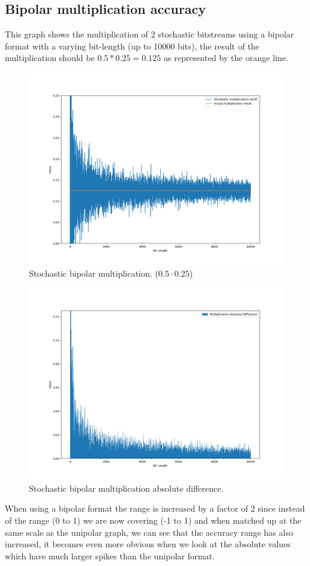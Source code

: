 \documentclass[a4paper,oneside,phd,etd]{BYUPhys}
\begin{document}
\subsection{Bipolar multiplication accuracy}
This graph shows the multiplication of 2 stochastic bitstreams using a bipolar format with a varying bit-length (up to 10000 bits), the result of the multiplication should be $0.5*0.25=0.125$ as represented by the orange line.
\begin{figure}[H]
\centering
\includegraphics[scale=0.4]{results/mult-bi.png}
\caption{Stochastic bipolar multiplication. ($0.5\cdot 0.25$)}
\label{fig:mult}
\end{figure}
\begin{figure}[H]
\centering
\includegraphics[scale=0.4]{results/mult-bi-abs.png}
\caption{Stochastic bipolar multiplication absolute difference.}
\label{fig:abs_mult}
\end{figure}
When using a bipolar format the range is increased by a factor of 2 since instead of the range (0 to 1) we are now covering (-1 to 1) and when matched up at the same scale as the unipolar graph, we can see that the accuracy range has also increased, it becomes even more obvious when we look at the absolute values which have much larger spikes than the unipolar format.
\end{document}
